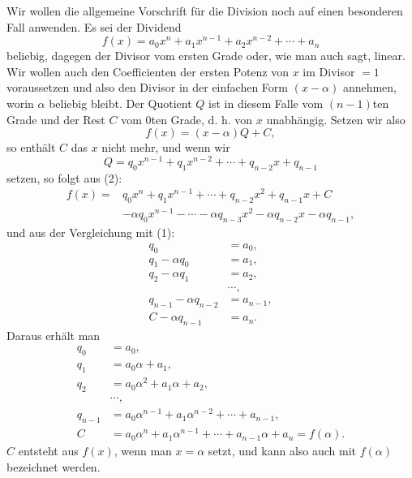 \documentclass[11pt]{article}
\begin{document}
Wir wollen die allgemeine Vorschrift für die Division noch auf einen besonderen Fall anwenden. Es sei der Dividend
\begin{equation}
 f(x)=a_0x^n+a_1x^{n-1}+a_2x^{n-2}+\cdots+a_n
\tag{1}
\end{equation}
beliebig, dagegen der Divisor vom ersten Grade oder, wie man auch sagt, linear. Wir wollen auch den Coefficienten der ersten Potenz von $x$ im Divisor $=1$ voraussetzen und also den Divisor in der einfachen Form $(x-\alpha)$ annehmen, worin $\alpha$ beliebig bleibt. Der Quotient $Q$ ist in diesem Falle vom $(n-1)$ten Grade und der Rest $C$ vom $0$ten Grade, d. h. von $x$ unabhängig. Setzen wir also
\begin{equation}
 f(x)=(x-\alpha)Q+C,
\tag{2}
\end{equation}
so enthält $C$ das $x$ nicht mehr, und wenn wir
\begin{equation}
 Q=q_0x^{n-1}+q_1x^{n-2}+\cdots+q_{n-2}x+q_{n-1}
\tag{3}
\end{equation}
setzen, so folgt aus (2):
\begin{equation}
\begin{aligned}
 f(x)={}&q_0x^n+q_1x^{n-1}+\cdots+q_{n-2}x^2+q_{n-1}x+C\\
&-\alpha q_0x^{n-1}-\cdots-\alpha q_{n-3}x^2-\alpha q_{n-2}x-\alpha q_{n-1},
\end{aligned}
\tag{4}
\end{equation}
und aus der Vergleichung mit (1):
\begin{equation}
\begin{aligned}
q_0&=a_0,\\
q_1-\alpha q_0&=a_1,\\
q_2-\alpha q_1&=a_2,\\
&\cdots,\\
q_{n-1}-\alpha q_{n-2}&=a_{n-1},\\
C-\alpha q_{n-1}&=a_n.
\end{aligned}
\tag{5}
\end{equation}
Daraus erhält man
\begin{equation}
\begin{aligned}
q_0&=a_0,\\
q_1&=a_0\alpha+a_1,\\
q_2&=a_0\alpha^2+a_1\alpha+a_2,\\
&\cdots,\\
q_{n-1}&=a_0\alpha^{n-1}+a_1\alpha^{n-2}+\cdots+a_{n-1},\\
C&=a_0\alpha^n+a_1\alpha^{n-1}+\cdots+a_{n-1}\alpha+a_n=f(\alpha).
\end{aligned}
\tag{6}
\end{equation}
$C$ entsteht aus $f(x)$, wenn man $x=\alpha$ setzt, und kann also auch mit $f(\alpha)$ bezeichnet werden.
\end{document}
